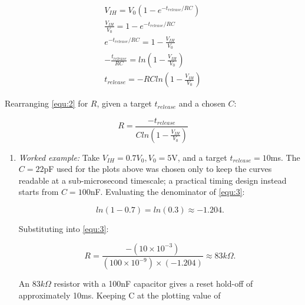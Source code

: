 \documentclass[conference]{IEEEtran}
\begin{document}
\begin{equation}
    \begin{split}
    V_{IH} = V_0(1-e^{-t_{release}/RC})\\
    \frac{V_{IH}}{V_0} = 1-e^{-t_{release}/RC}\\
    e^{-t_{release}/RC} = 1-\frac{V_{IH}}{V_0}\\
    -\frac{t_{release}}{RC} = ln(1-\frac{V_{IH}}{V_0})\\
    t_{release} = -RCln(1-\frac{V_{IH}}{V_0})
    \label{equ:2}
    \end{split}
\end{equation}

Rearranging \ref{equ:2} for $R$, given a target $t_{release}$ and a chosen $C$:

\begin{equation}
    R = \frac{-t_{release}}{Cln(1-\frac{V_{IH}}{V_0})}
    \label{equ:3}
\end{equation}

\begin{enumerate}
    \item\textit{Worked example:} Take $V_{IH}=0.7V_0, V_0=5$V, and a target $t_{release}=10$ms. The $C = 22$pF used for the plots above was chosen only to keep the curves readable at a sub-microsecond timescale; a practical timing design instead starts from $C=100$nF. Evaluating the denominator of \ref{equ:3}:
    
    \begin{equation}
        ln(1-0.7) = ln(0.3)\approx-1.204.
    \end{equation}
    
    Substituting into \ref{equ:3}:

    \begin{equation}
        R = \frac{-(10\times10^{-3})}{(100\times10^{-9})\times(-1.204)}\approx83k\Omega.
    \end{equation}

    An $83k\Omega$ resistor with a 100nF capacitor gives a reset hold-off of approximately 10ms. Keeping C at the plotting value of
\end{enumerate}
\end{document}
